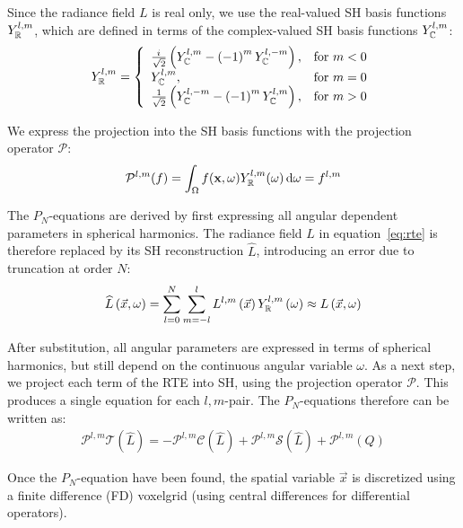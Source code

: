 Since the radiance field $L$ is real only, we use the real-valued SH basis functions $Y_{\mathbb{R}}^{l,m}$, which are defined in terms of the complex-valued SH basis functions $Y_{\mathbb{C}}^{l,m}$:
\begin{align}
Y_{\mathbb{R}}^{l,m}=
\left\{
\begin{array}{lr}
\frac{{i\mkern1mu}}{\sqrt{2}}\left(Y_{\mathbb{C}}^{l,m}-\left(-1\right)^mY_{\mathbb{C}}^{l,-m}\right), & \text{for } m < 0\\
Y_{\mathbb{C}}^{l,m}, & \text{for } m = 0\\
\frac{1}{\sqrt{2}}\left(Y_{\mathbb{C}}^{l,-m}-\left(-1\right)^mY_{\mathbb{C}}^{l,m}\right), & \text{for } m > 0
\end{array}
\right.
\label{eq:sh_real_basis}
\end{align}

We express the projection into the SH basis functions with the projection operator $\mathcal{P}$:
\begin{align}
\mathcal{P}^{l, m}(f) = \int_{\Omega}f(\mathbf{x}, \omega) Y_{\mathbb{R}}^{l,m}(\omega)\,\mathrm{d}\omega = f^{l,m}
\nonumber
\end{align}

The $P_N$-equations are derived by first expressing all angular dependent parameters in spherical harmonics. The radiance field $L$ in equation~\ref{eq:rte} is therefore replaced by its SH reconstruction $\widehat{L}$, introducing an error due to truncation at order $N$:
\begin{align}
\widehat{L}\left(\vec{x}, \omega\right) =
\sum_{l=0}^{N}
{
\sum_{m=-l}^{l}
{
L^{l,m}\left(\vec{x}\right)Y_{\mathbb{R}}^{l,m}\left(\omega\right)
}
}
\approx
L\left(\vec{x}, \omega\right)
\nonumber
\end{align}

After substitution, all angular parameters are expressed in terms of spherical harmonics, but still depend on the continuous angular variable $\omega$. As a next step, we project each term of the RTE into SH, using the projection operator $\mathcal{P}$. This produces a single equation for each $l,m$-pair. The $P_N$-equations therefore can be written as:
\begin{align}
\mathcal{P}^{l,m}\mathcal{T}\left(\widehat{L}\right)
=
-\mathcal{P}^{l,m}\mathcal{C}\left(\widehat{L}\right) 
+\mathcal{P}^{l,m}\mathcal{S}\left(\widehat{L}\right)
+\mathcal{P}^{l,m}\left(Q\right)
\label{eq:pn_operator_notation}
\end{align}

Once the $P_N$-equation have been found, the spatial variable $\vec{x}$ is discretized using a finite difference (FD) voxelgrid (using central differences for differential operators).

